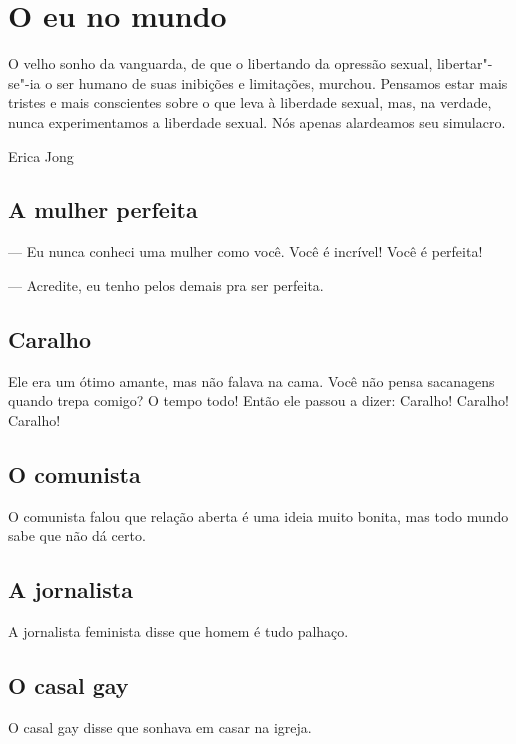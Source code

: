 \part{O eu no mundo} 

\thispagestyle{empty}\vspace*{.4\textwidth} 

\epigraph{O velho sonho da vanguarda, de que o libertando da opressão sexual,
libertar"-se"-ia o ser humano de suas inibições e limitações, murchou.
Pensamos estar mais tristes e mais conscientes sobre o que leva à
liberdade sexual, mas, na verdade, nunca experimentamos a liberdade
sexual. Nós apenas alardeamos seu simulacro.}{Erica Jong} 

\chapter{A mulher perfeita}

\mbox{}\indent{}--- Eu nunca conheci uma mulher como você. Você é incrível! Você é
perfeita!

--- Acredite, eu tenho pelos demais pra ser perfeita.

\chapter{Caralho}

Ele era um ótimo amante, mas não falava na cama. Você não pensa
sacanagens quando trepa comigo? O tempo todo! Então ele passou a dizer:
Caralho! Caralho! Caralho!

\chapter{O comunista}

O comunista falou que relação aberta é uma ideia muito bonita, mas todo
mundo sabe que não dá certo.

\chapter{A jornalista}

A jornalista feminista disse que homem é tudo palhaço.

\chapter{O casal gay}

O casal gay disse que sonhava em casar na igreja.

